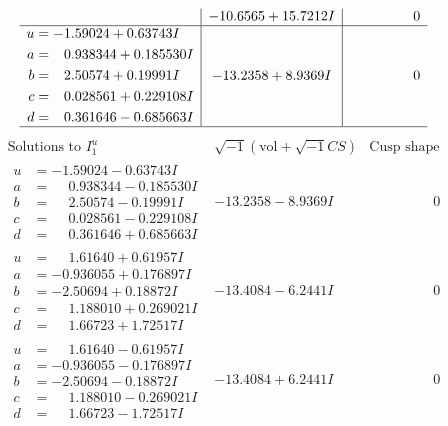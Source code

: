 \documentclass[1p]{elsarticle_modified}
\theoremstyle{definition}
\newcommand{\I}{\sqrt{-1}}
\begin{document}
$$\begin{array}{c|c|c}
 & -10.6565 + 15.7212 I & \phantom{-0.000000 } 0 \\ \hline\begin{aligned}
u &= -1.59024 + 0.63743 I \\
a &= \phantom{-}0.938344 + 0.185530 I \\
b &= \phantom{-}2.50574 + 0.19991 I \\
c &= \phantom{-}0.028561 + 0.229108 I \\
d &= \phantom{-}0.361646 - 0.685663 I\end{aligned}
 & -13.2358 + 8.9369 I & \phantom{-0.000000 } 0\\
 \hline 
 \end{array}$$\newpage$$\begin{array}{c|c|c}  
\text{Solutions to }I^u_{1}& \I (\text{vol} + \sqrt{-1}CS) & \text{Cusp shape}\\
 \hline 
\begin{aligned}
u &= -1.59024 - 0.63743 I \\
a &= \phantom{-}0.938344 - 0.185530 I \\
b &= \phantom{-}2.50574 - 0.19991 I \\
c &= \phantom{-}0.028561 - 0.229108 I \\
d &= \phantom{-}0.361646 + 0.685663 I\end{aligned}
 & -13.2358 - 8.9369 I & \phantom{-0.000000 } 0 \\ \hline\begin{aligned}
u &= \phantom{-}1.61640 + 0.61957 I \\
a &= -0.936055 + 0.176897 I \\
b &= -2.50694 + 0.18872 I \\
c &= \phantom{-}1.188010 + 0.269021 I \\
d &= \phantom{-}1.66723 + 1.72517 I\end{aligned}
 & -13.4084 - 6.2441 I & \phantom{-0.000000 } 0 \\ \hline\begin{aligned}
u &= \phantom{-}1.61640 - 0.61957 I \\
a &= -0.936055 - 0.176897 I \\
b &= -2.50694 - 0.18872 I \\
c &= \phantom{-}1.188010 - 0.269021 I \\
d &= \phantom{-}1.66723 - 1.72517 I\end{aligned}
 & -13.4084 + 6.2441 I & \phantom{-0.000000 } 0 \\ \hline\begin{aligned}

\end{aligned}
\end{array}$$
\end{document}
